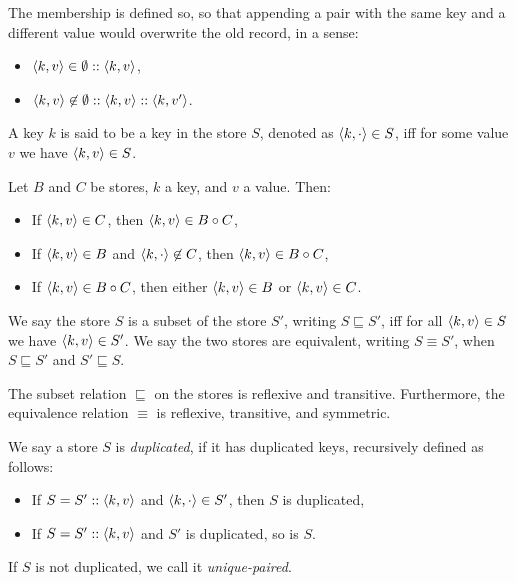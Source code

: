 The membership is defined so, so that appending a pair with the same key and a different value would overwrite the old record, in a sense:
\begin{itemize}
    \item $\langle k, v \rangle \in \emptyset :: \langle k, v \rangle$,
    \item $\langle k, v \rangle \not\in \emptyset :: \langle k, v \rangle :: \left\langle k, v' \right\rangle$.
\end{itemize}

\begin{definition}
A key $k$ is said to be a key in the store $S$, denoted as $\left\langle k, \cdot \right\rangle \in S$, iff for some value $v$ we have $\langle k, v \rangle \in S$.
\end{definition}

\begin{lemma}
Let $B$ and $C$ be stores, $k$ a key, and $v$ a value. Then:
\begin{itemize}
    \item If $\langle k, v \rangle \in C$, then $\langle k, v \rangle \in B \circ C$,
    \item If $\langle k, v \rangle \in B$ and $\left\langle k, \cdot \right\rangle \not\in C$, then $\langle k, v \rangle \in B \circ C$,
    \item If $\langle k, v \rangle \in B \circ C$, then either $\langle k, v \rangle \in B$ or $\langle k, v \rangle \in C$.
\end{itemize}
\end{lemma}

\begin{definition}[Equivalence]
We say the store $S$ is a subset of the store $S'$, writing $S \sqsubseteq S'$, iff for all $\langle k, v \rangle \in S$ we have $\langle k, v \rangle \in S'$. We say the two stores are equivalent, writing $S \equiv S'$, when $S \sqsubseteq S'$ and $S' \sqsubseteq S$.
\end{definition}

\begin{lemma}
The subset relation $\sqsubseteq$ on the stores is reflexive and transitive. Furthermore, the equivalence relation $\equiv$ is reflexive, transitive, and symmetric.
\end{lemma}

\begin{definition}
We say a store $S$ is \textit{duplicated}, if it has duplicated keys, recursively defined as follows:
\begin{itemize}
    \item If $S = S' :: \langle k, v \rangle$ and $\left\langle k, \cdot \right\rangle \in S'$, then $S$ is duplicated,
    \item If $S = S' :: \langle k, v \rangle$ and $S'$ is duplicated, so is $S$.
\end{itemize}
If $S$ is not duplicated, we call it \textit{unique-paired}.
\end{definition}

